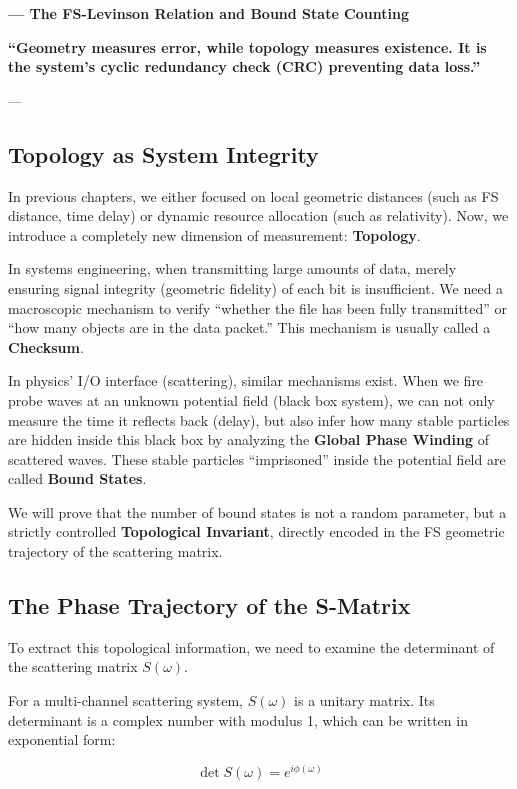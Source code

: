 \documentclass[11pt,a4paper,twoside]{book}
\begin{document}
\textbf{--- The FS-Levinson Relation and Bound State Counting}

\textbf{``Geometry measures error, while topology measures existence. It is the system's cyclic redundancy check (CRC) preventing data loss.''}

---

\subsection{Topology as System Integrity}

In previous chapters, we either focused on local geometric distances (such as FS distance, time delay) or dynamic resource allocation (such as relativity). Now, we introduce a completely new dimension of measurement: \textbf{Topology}.

In systems engineering, when transmitting large amounts of data, merely ensuring signal integrity (geometric fidelity) of each bit is insufficient. We need a macroscopic mechanism to verify ``whether the file has been fully transmitted'' or ``how many objects are in the data packet.'' This mechanism is usually called a \textbf{Checksum}.

In physics' I/O interface (scattering), similar mechanisms exist. When we fire probe waves at an unknown potential field (black box system), we can not only measure the time it reflects back (delay), but also infer how many stable particles are hidden inside this black box by analyzing the \textbf{Global Phase Winding} of scattered waves. These stable particles ``imprisoned'' inside the potential field are called \textbf{Bound States}.

We will prove that the number of bound states is not a random parameter, but a strictly controlled \textbf{Topological Invariant}, directly encoded in the FS geometric trajectory of the scattering matrix.

\subsection{The Phase Trajectory of the S-Matrix}

To extract this topological information, we need to examine the determinant of the scattering matrix $S(\omega)$.

For a multi-channel scattering system, $S(\omega)$ is a unitary matrix. Its determinant is a complex number with modulus 1, which can be written in exponential form:

$$\det S(\omega) = e^{i\phi(\omega)}$$
\end{document}
